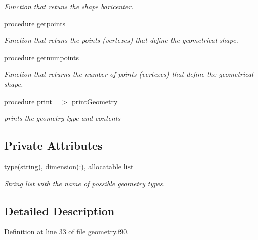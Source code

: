 \begin{DoxyCompactItemize}
\begin{DoxyCompactList}\small\item\em Function that retuns the shape baricenter. \end{DoxyCompactList}\item 
procedure \mbox{\hyperlink{structgeometry__mod_1_1geometry__class_a4dd64d46f41c5c429a0b2b88250fa04e}{getpoints}}
\begin{DoxyCompactList}\small\item\em Function that retuns the points (vertexes) that define the geometrical shape. \end{DoxyCompactList}\item 
procedure \mbox{\hyperlink{structgeometry__mod_1_1geometry__class_a8988388d683fbf7e5727a39b71d3c479}{getnumpoints}}
\begin{DoxyCompactList}\small\item\em Function that returns the number of points (vertexes) that define the geometrical shape. \end{DoxyCompactList}\item 
procedure \mbox{\hyperlink{structgeometry__mod_1_1geometry__class_afbb83bea5cd3f73708b448d3c732ea7c}{print}} =$>$ print\+Geometry
\begin{DoxyCompactList}\small\item\em prints the geometry type and contents \end{DoxyCompactList}\end{DoxyCompactItemize}
\subsection*{Private Attributes}
\begin{DoxyCompactItemize}
\item 
type(string), dimension(\+:), allocatable \mbox{\hyperlink{structgeometry__mod_1_1geometry__class_a218ff308d9bb94f4386573d7329babc6}{list}}
\begin{DoxyCompactList}\small\item\em String list with the name of possible geometry types. \end{DoxyCompactList}\end{DoxyCompactItemize}


\subsection{Detailed Description}


Definition at line 33 of file geometry.\+f90.



